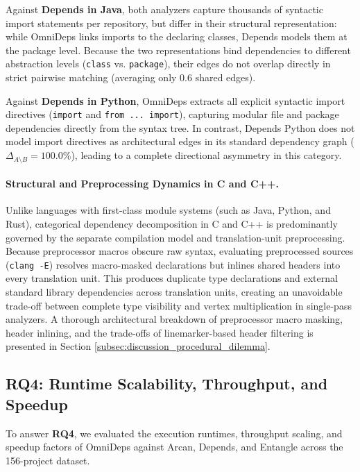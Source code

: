 Against \textbf{Depends in Java}, both analyzers capture thousands of
syntactic import statements per repository, but differ in their structural
representation: while OmniDeps links imports to the declaring classes,
Depends models them at the package level. Because the two representations
bind dependencies to different abstraction levels (\texttt{class} vs.
\texttt{package}), their edges do not overlap directly in strict pairwise
matching (averaging only 0.6 shared edges).

Against \textbf{Depends in Python}, OmniDeps extracts all explicit
syntactic import directives (\texttt{import} and \texttt{from ...
import}), capturing modular file and package dependencies directly
from the syntax tree. In contrast, Depends Python does not model
import directives as architectural edges in its standard dependency
graph ($\Delta_{A \setminus B} = 100.0\%$), leading to a complete
directional asymmetry in this category.

\paragraph{Structural and Preprocessing Dynamics in C and C++.}
\label{subsubsec:c_cpp_preprocessing_rq3} Unlike languages with first-class
module systems (such as Java, Python, and Rust), categorical dependency
decomposition in C and C++ is predominantly governed by the separate compilation
model and translation-unit preprocessing. Because preprocessor macros obscure
raw syntax, evaluating preprocessed sources (\texttt{clang -E})
resolves macro-masked declarations but inlines shared headers into
every translation unit. This produces duplicate type declarations and
external standard library dependencies across translation units, creating an
unavoidable trade-off between complete type visibility and vertex
multiplication in single-pass analyzers. A thorough architectural
breakdown of preprocessor macro masking, header inlining, and the
trade-offs of linemarker-based header filtering is presented in
Section \ref{subsec:discussion_procedural_dilemma}.

\subsection[RQ4: Runtime Scalability, Throughput, and Speedup]{RQ4:
Runtime Scalability, Throughput, and Speed\-up}
\label{subsec:results_rq4}

To answer \textbf{RQ4}, we evaluated the execution runtimes,
throughput scaling, and speedup factors of OmniDeps against Arcan,
Depends, and Entangle across the 156-project dataset.

